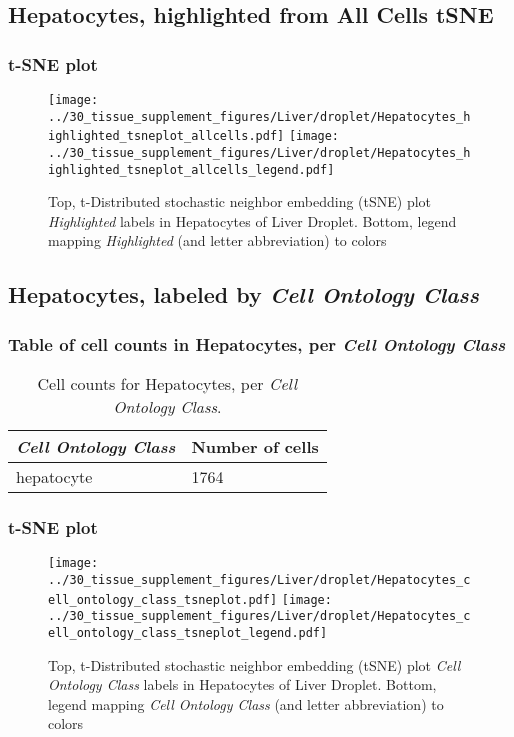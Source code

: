 \clearpage
\subsection{Hepatocytes, highlighted from All Cells tSNE}
\subsubsection{t-SNE plot}
\begin{figure}[h]
\centering
\texttt{[image: ../30\_tissue\_supplement\_figures/Liver/droplet/Hepatocytes\_highlighted\_tsneplot\_allcells.pdf]}
\texttt{[image: ../30\_tissue\_supplement\_figures/Liver/droplet/Hepatocytes\_highlighted\_tsneplot\_allcells\_legend.pdf]}
\caption{Top, t-Distributed stochastic neighbor embedding (tSNE) plot  \emph{Highlighted} labels in Hepatocytes of Liver Droplet. Bottom, legend mapping \emph{Highlighted} (and letter abbreviation) to colors}
\end{figure}


\clearpage

\subsection{Hepatocytes, labeled by \emph{Cell Ontology Class}}
\subsubsection{Table of cell counts in Hepatocytes, per \emph{Cell Ontology Class}}\begin{table}[h]
\centering
\label{my-label}
\begin{tabular}{@{}ll@{}}
\toprule

\emph{Cell Ontology Class}& Number of cells \\ \midrule
hepatocyte & 1764 \\
\bottomrule
\end{tabular}
\caption{Cell counts for Hepatocytes, per \emph{Cell Ontology Class}.}
\end{table}

\clearpage
\subsubsection{t-SNE plot}
\begin{figure}[h]
\centering
\texttt{[image: ../30\_tissue\_supplement\_figures/Liver/droplet/Hepatocytes\_cell\_ontology\_class\_tsneplot.pdf]}
\texttt{[image: ../30\_tissue\_supplement\_figures/Liver/droplet/Hepatocytes\_cell\_ontology\_class\_tsneplot\_legend.pdf]}
\caption{Top, t-Distributed stochastic neighbor embedding (tSNE) plot  \emph{Cell Ontology Class} labels in Hepatocytes of Liver Droplet. Bottom, legend mapping \emph{Cell Ontology Class} (and letter abbreviation) to colors}
\end{figure}


